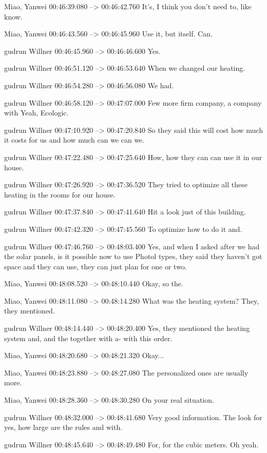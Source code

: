 {Miao, Yanwei 00:46:39.080 --> 00:46:42.760
It's, I think you don't need to, like know.

Miao, Yanwei 00:46:43.560 --> 00:46:45.960
Use it, but itself. Can.

gudrun Willner 00:46:45.960 --> 00:46:46.600
Yes.

gudrun Willner 00:46:51.120 --> 00:46:53.640
When we changed our heating.

gudrun Willner 00:46:54.280 --> 00:46:56.080
We had.

gudrun Willner 00:46:58.120 --> 00:47:07.000
Few more firm company, a company with Yeah, Ecologic.

gudrun Willner 00:47:10.920 --> 00:47:20.840
So they said this will cost how much it costs for us and how much can we can we.

gudrun Willner 00:47:22.480 --> 00:47:25.640
How, how they can can use it in our house.

gudrun Willner 00:47:26.920 --> 00:47:36.520
They tried to optimize all these heating in the rooms for our house.

gudrun Willner 00:47:37.840 --> 00:47:41.640
Hit a look just of this building.

gudrun Willner 00:47:42.320 --> 00:47:45.560
To optimize how to do it and.

gudrun Willner 00:47:46.760 --> 00:48:03.400
Yes, and when I asked after we had the solar panels, is it possible now to use Photol types, they said they haven't got space and they can use, they can just plan for one or two.

Miao, Yanwei 00:48:08.520 --> 00:48:10.440
Okay, so the.

Miao, Yanwei 00:48:11.080 --> 00:48:14.280
What was the heating system? They, they mentioned.

gudrun Willner 00:48:14.440 --> 00:48:20.400
Yes, they mentioned the heating system and, and the together with a- with this order.

Miao, Yanwei 00:48:20.680 --> 00:48:21.320
Okay...

Miao, Yanwei 00:48:23.880 --> 00:48:27.080
The personalized ones are usually more.

Miao, Yanwei 00:48:28.360 --> 00:48:30.280
On your real situation.

gudrun Willner 00:48:32.000 --> 00:48:41.680
Very good information. The look for yes, how large are the rules and with.

gudrun Willner 00:48:45.640 --> 00:48:49.480
For, for the cubic meters. Oh yeah.

}
